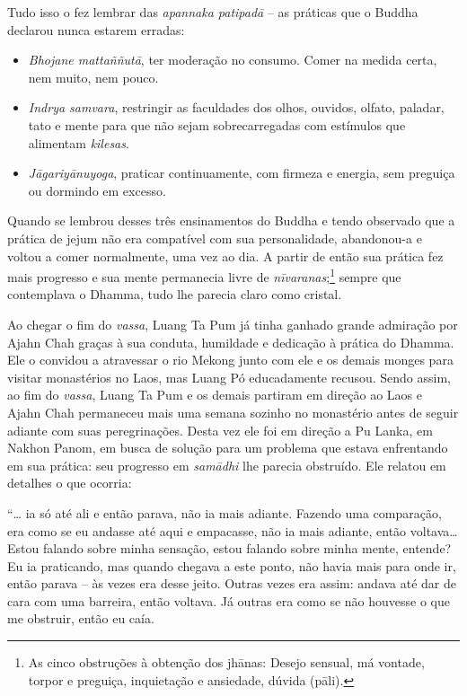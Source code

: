 Tudo isso o fez lembrar das \emph{apannaka patipadā} -- as práticas que
o Buddha declarou nunca estarem erradas:

\begin{itemize}
\item
  \emph{Bhojane mattaññutā}, ter moderação no consumo. Comer na medida
  certa, nem muito, nem pouco.
\item
  \emph{Indrya samvara}, restringir as faculdades dos olhos, ouvidos,
  olfato, paladar, tato e mente para que não sejam sobrecarregadas com
  estímulos que alimentam \emph{kilesas}.
\item
  \emph{Jāgariyānuyoga}, praticar continuamente, com firmeza e energia,
  sem preguiça ou dormindo em excesso.
\end{itemize}

Quando se lembrou desses três ensinamentos do Buddha e tendo observado
que a prática de jejum não era compatível com sua personalidade,
abandonou-a e voltou a comer normalmente, uma vez ao dia. A partir de
então sua prática fez mais progresso e sua mente permanecia livre de
\emph{nīvaranas};\footnote{As cinco obstruções à obtenção dos jhānas:
  Desejo sensual, má vontade, torpor e preguiça, inquietação e
  ansiedade, dúvida (pāli).} sempre que contemplava o Dhamma, tudo lhe
parecia claro como cristal.

Ao chegar o fim do \emph{vassa}, Luang Ta Pum já tinha ganhado grande
admiração por Ajahn Chah graças à sua conduta, humildade e dedicação à
prática do Dhamma. Ele o convidou a atravessar o rio Mekong junto com
ele e os demais monges para visitar monastérios no Laos, mas Luang Pó
educadamente recusou. Sendo assim, ao fim do \emph{vassa}, Luang Ta Pum
e os demais partiram em direção ao Laos e Ajahn Chah permaneceu mais uma
semana sozinho no monastério antes de seguir adiante com suas
peregrinações. Desta vez ele foi em direção a Pu Lanka, em Nakhon Panom,
em busca de solução para um problema que estava enfrentando em sua
prática: seu progresso em \emph{samādhi} lhe parecia obstruído. Ele
relatou em detalhes o que ocorria:

``\ldots{} ia só até ali e então parava, não ia mais adiante. Fazendo
uma comparação, era como se eu andasse até aqui e empacasse, não ia mais
adiante, então voltava\ldots{} Estou falando sobre minha sensação, estou
falando sobre minha mente, entende? Eu ia praticando, mas quando chegava
a este ponto, não havia mais para onde ir, então parava -- às vezes era
desse jeito. Outras vezes era assim: andava até dar de cara com uma
barreira, então voltava. Já outras era como se não houvesse o que me
obstruir, então eu caía.

